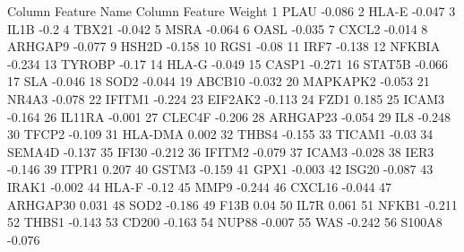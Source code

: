 \documentclass{article}\usepackage[]{graphicx}\usepackage[]{color}
\begin{document}
\begin{Schunk}
\begin{Soutput}
   Column Feature Name Column Feature Weight
1  PLAU                -0.086               
2  HLA-E               -0.047               
3  IL1B                -0.2                 
4  TBX21               -0.042               
5  MSRA                -0.064               
6  OASL                -0.035               
7  CXCL2               -0.014               
8  ARHGAP9             -0.077               
9  HSH2D               -0.158               
10 RGS1                -0.08                
11 IRF7                -0.138               
12 NFKBIA              -0.234               
13 TYROBP              -0.17                
14 HLA-G               -0.049               
15 CASP1               -0.271               
16 STAT5B              -0.066               
17 SLA                 -0.046               
18 SOD2                -0.044               
19 ABCB10              -0.032               
20 MAPKAPK2            -0.053               
21 NR4A3               -0.078               
22 IFITM1              -0.224               
23 EIF2AK2             -0.113               
24 FZD1                0.185                
25 ICAM3               -0.164               
26 IL11RA              -0.001               
27 CLEC4F              -0.206               
28 ARHGAP23            -0.054               
29 IL8                 -0.248               
30 TFCP2               -0.109               
31 HLA-DMA             0.002                
32 THBS4               -0.155               
33 TICAM1              -0.03                
34 SEMA4D              -0.137               
35 IFI30               -0.212               
36 IFITM2              -0.079               
37 ICAM3               -0.028               
38 IER3                -0.146               
39 ITPR1               0.207                
40 GSTM3               -0.159               
41 GPX1                -0.003               
42 ISG20               -0.087               
43 IRAK1               -0.002               
44 HLA-F               -0.12                
45 MMP9                -0.244               
46 CXCL16              -0.044               
47 ARHGAP30            0.031                
48 SOD2                -0.186               
49 F13B                0.04                 
50 IL7R                0.061                
51 NFKB1               -0.211               
52 THBS1               -0.143               
53 CD200               -0.163               
54 NUP88               -0.007               
55 WAS                 -0.242               
56 S100A8              -0.076               
\end{Soutput}


\end{Schunk}
\end{document}
